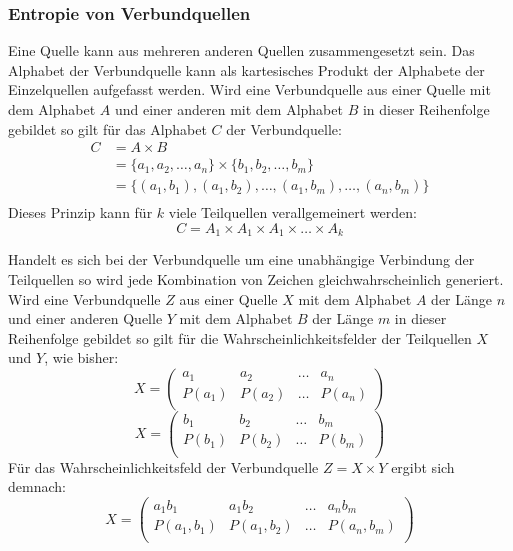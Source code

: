 
\subsubsection*{Entropie von Verbundquellen}
Eine Quelle kann aus mehreren anderen Quellen zusammengesetzt sein. Das Alphabet der Verbundquelle kann als kartesisches Produkt der Alphabete der Einzelquellen aufgefasst werden. Wird eine Verbundquelle aus einer Quelle mit dem Alphabet $A$ und einer anderen mit dem Alphabet $B$ in dieser Reihenfolge gebildet so gilt für das Alphabet $C$ der Verbundquelle:
\begin{align*}
	C &= A \times B \\
	  &= \{a_1, a_2, \ldots, a_n\} \times \{b_1, b_2, \ldots, b_m\} \\
	  &= \{(a_1,b_1), (a_1,b_2), \ldots, (a_1,b_m), \ldots, (a_n,b_m) \}\\
\end{align*}
Dieses Prinzip kann für $k$ viele Teilquellen verallgemeinert werden:
$$ C = A_1 \times A_1 \times A_1 \times \ldots \times A_k $$ 

Handelt es sich bei der Verbundquelle um eine unabhängige Verbindung der Teilquellen so wird jede Kombination von Zeichen gleichwahrscheinlich generiert. Wird eine Verbundquelle $Z$ aus einer Quelle $X$ mit dem Alphabet $A$ der Länge $n$ und einer anderen Quelle $Y$ mit dem Alphabet $B$ der Länge $m$ in dieser Reihenfolge gebildet so gilt für die Wahrscheinlichkeitsfelder der Teilquellen $X$ und $Y$, wie bisher:
$$
	X =
	\left(
		\begin{array}{*{5}{c}}
		  a_1    &  a_2   & \ldots &  a_n   \\
		  P(a_1) & P(a_2) & \ldots & P(a_n) \\
		\end{array}
	\right)
$$
$$
	X =
	\left(
		\begin{array}{*{5}{c}}
		  b_1    &  b_2   & \ldots &  b_m   \\
		  P(b_1) & P(b_2) & \ldots & P(b_m) \\
		\end{array}
	\right)
$$
Für das Wahrscheinlichkeitsfeld der Verbundquelle $Z = X \times Y$ ergibt sich demnach:
$$
	X =
	\left(
		\begin{array}{*{5}{c}}
		  a_1b_1    &  a_1b_2   & \ldots &  a_nb_m   \\
		  P(a_1, b_1) & P(a_1, b_2) & \ldots & P(a_n, b_m) \\
		\end{array}
	\right)
$$


